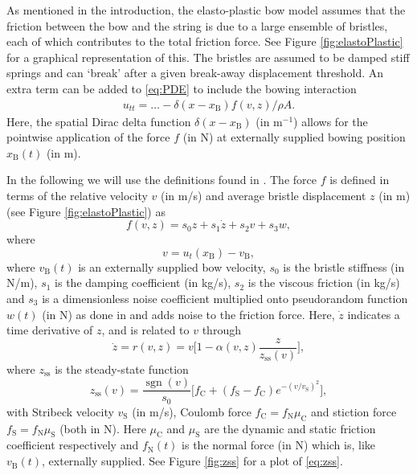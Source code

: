 \documentclass[twoside,a4paper,dvipsnames]{article}
\DeclareMathOperator{\sgn}{sgn}
\begin{document}
As mentioned in the introduction, the elasto-plastic bow model assumes that the friction between the bow and the string is due to a large ensemble of bristles, each of which contributes to the total friction force. See Figure \ref{fig:elastoPlastic} for a graphical representation of this. The bristles are assumed to be damped stiff springs and can `break' after a given break-away displacement threshold. An extra term can be added to \eqref{eq:PDE} to include the bowing interaction
\begin{equation}
    \begin{aligned}
    \label{eq:bowingTerm}
        u_{tt} = \hdots - \delta(x-x_\text{B})f(v, z)/\rho A.
    \end{aligned}
\end{equation}
Here, the spatial Dirac delta function $\delta(x-x_\text{B})$ (in m$^{-1}$) allows for the pointwise application of the force $f$ (in N) at externally supplied bowing position $x_\text{B}(t)$ (in m). 

 In the following we will use the definitions found in \cite{Dupont2002}. The force $f$ is defined in terms of the relative velocity $v$ (in m/s) and average bristle displacement $z$ (in m) (see Figure \ref{fig:elastoPlastic}) as
\begin{equation}\label{eq:forceFunction}
    f(v, z) = s_0z + s_1\dot z + s_2v + s_3w,
\end{equation}
where \begin{equation}\label{eq:relVel}
  v = u_t(x_\text{B}) - v_\text{B},
\end{equation}
where $v_\text{B}(t)$ is an externally supplied bow velocity,
$s_0$ is the bristle stiffness (in N/m), $s_1$ is the damping coefficient (in kg/s), $s_2$ is the viscous friction (in kg/s) and $s_3$ is a dimensionless noise coefficient multiplied onto pseudorandom function $w(t)$ (in N) as done in \cite{Serafin2004} and adds noise to the friction force. Here, $\dot{z}$ indicates a time derivative of $z$, and is related to $v$ through
\begin{equation}\label{eq:zdot}
    \dot z = r(v, z) = v \bigg[ 1-  \alpha(v, z)\frac{z}{z_\text{ss}(v)}\bigg],
\end{equation}
where $z_\text{ss}$ is the steady-state function
\begin{equation}\label{eq:zss}
    z_\text{ss}(v) = \frac{\sgn(v)}{s_0}\Big[f_\text{C}+(f_\text{S}-f_\text{C})e^{-(v/v_\text{S})^2}\Big],
\end{equation}
with Stribeck velocity $v_\text{S}$ (in m/s), Coulomb force $f_\text{C} = f_\text{N}\mu_\text{C}$ and stiction force $f_\text{S} = f_\text{N}\mu_\text{S}$ (both in N). Here $\mu_\text{C}$ and $\mu_\text{S}$ are the dynamic and static friction coefficient respectively and $f_\text{N}(t)$ is the normal force (in N) which is, like $v_\text{B}(t)$, externally supplied. See Figure \ref{fig:zss} for a plot of \eqref{eq:zss}. 
\end{document}
